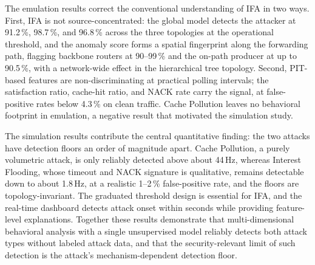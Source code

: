 \documentclass[12pt]{report}
\begin{document}
The emulation results correct the conventional understanding of IFA in two ways. First, IFA is not source-concentrated: the global model detects the attacker at 91.2\,\%, 98.7\,\%, and 96.8\,\% across the three topologies at the operational threshold, and the anomaly score forms a spatial fingerprint along the forwarding path, flagging backbone routers at 90--99\,\% and the on-path producer at up to 90.5\,\%, with a network-wide effect in the hierarchical tree topology. Second, PIT-based features are non-discriminating at practical polling intervals; the satisfaction ratio, cache-hit ratio, and NACK rate carry the signal, at false-positive rates below 4.3\,\% on clean traffic. Cache Pollution leaves no behavioral footprint in emulation, a negative result that motivated the simulation study.

The simulation results contribute the central quantitative finding: the two attacks have detection floors an order of magnitude apart. Cache Pollution, a purely volumetric attack, is only reliably detected above about 44\,Hz, whereas Interest Flooding, whose timeout and NACK signature is qualitative, remains detectable down to about 1.8\,Hz, at a realistic 1--2\,\% false-positive rate, and the floors are topology-invariant. The graduated threshold design is essential for IFA, and the real-time dashboard detects attack onset within seconds while providing feature-level explanations. Together these results demonstrate that multi-dimensional behavioral analysis with a single unsupervised model reliably detects both attack types without labeled attack data, and that the security-relevant limit of such detection is the attack's mechanism-dependent detection floor.

\renewcommand{\bibname}{References}

\nocite{*}

\end{document}
